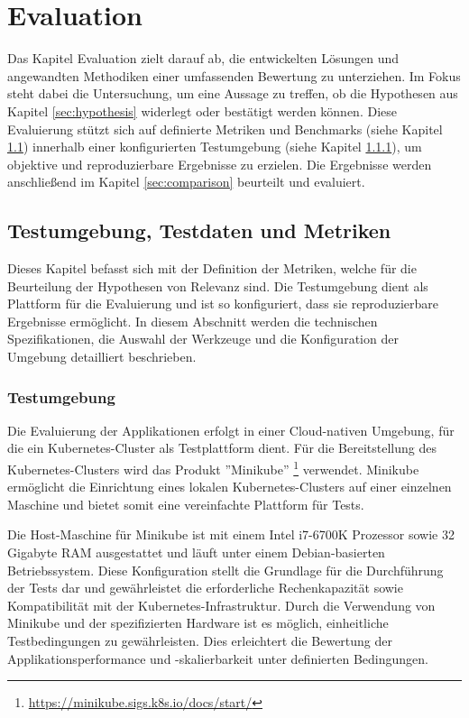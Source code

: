 \chapter{Evaluation}
\label{chap:evaluation}
Das Kapitel Evaluation zielt darauf ab, die entwickelten Lösungen und angewandten Methodiken einer umfassenden Bewertung zu unterziehen. Im Fokus steht dabei die Untersuchung, um eine Aussage zu treffen, ob die Hypothesen aus Kapitel \ref{sec:hypothesis} widerlegt oder bestätigt werden können. Diese Evaluierung stützt sich auf definierte Metriken und Benchmarks (siehe Kapitel \ref{sec:metrics}) innerhalb einer konfigurierten Testumgebung (siehe Kapitel \ref{subsec:testenv}), um objektive und reproduzierbare Ergebnisse zu erzielen. Die Ergebnisse werden anschließend im Kapitel \ref{sec:comparison} beurteilt und evaluiert.
\chapterstart

\section{Testumgebung, Testdaten und Metriken} \label{sec:metrics}
Dieses Kapitel befasst sich mit der Definition der Metriken, welche für die Beurteilung der Hypothesen von Relevanz sind. Die Testumgebung dient als Plattform für die Evaluierung und ist so konfiguriert, dass sie reproduzierbare Ergebnisse ermöglicht. In diesem Abschnitt werden die technischen Spezifikationen, die Auswahl der Werkzeuge und die Konfiguration der Umgebung detailliert beschrieben.
\subsection{Testumgebung} \label{subsec:testenv}
Die Evaluierung der Applikationen erfolgt in einer Cloud-nativen Umgebung, für die ein Kubernetes-Cluster als Testplattform dient. Für die Bereitstellung des Kubernetes-Clusters wird das Produkt ''Minikube'' \footnote{\url{https://minikube.sigs.k8s.io/docs/start/}} verwendet. Minikube ermöglicht die Einrichtung eines lokalen Kubernetes-Clusters auf einer einzelnen Maschine und bietet somit eine vereinfachte Plattform für Tests.

Die Host-Maschine für Minikube ist mit einem Intel i7-6700K Prozessor sowie 32 Gigabyte \ac{RAM} ausgestattet und läuft unter einem Debian-basierten Betriebssystem. Diese Konfiguration stellt die Grundlage für die Durchführung der Tests dar und gewährleistet die erforderliche Rechenkapazität sowie Kompatibilität mit der Kubernetes-Infrastruktur.
Durch die Verwendung von Minikube und der spezifizierten Hardware ist es möglich, einheitliche Testbedingungen zu gewährleisten. Dies erleichtert die Bewertung der Applikationsperformance und -skalierbarkeit unter definierten Bedingungen.

